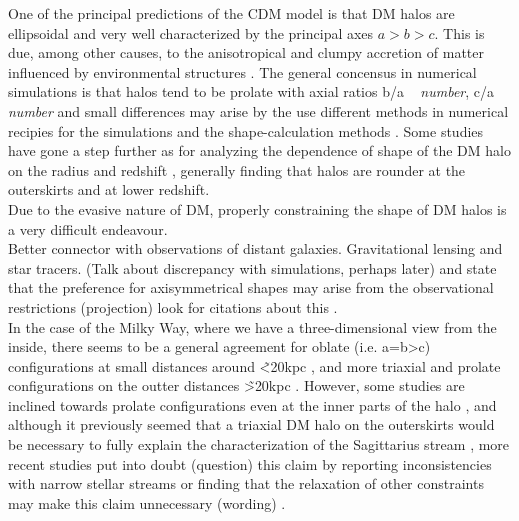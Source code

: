 \documentclass[a4paper,fleqn,usenatbib]{mnras}
\begin{document}
One of the principal predictions of the CDM model is that DM halos are ellipsoidal and very well characterized by the principal axes $a>b>c$. This is due, among other causes, to the anisotropical and clumpy accretion of matter influenced by environmental structures \citep[see?][]{environment-shape}. The general concensus in numerical simulations \citep[e.g.][]{TriaxialHalos1,TriaxialHalos2,etc} is that halos tend to be prolate with axial ratios b/a ~ \textit{number}, c/a ~ \textit{number} and small differences may arise by the use different methods in numerical recipies for the simulations and the shape-calculation methods  \citep[see][]{Allgood et al. 2006}. Some studies have gone a step further as for analyzing the dependence of shape of the DM halo on the radius and redshift \citep[e.g.][]{Shape-radius-papers, including Allgood}, generally finding that halos are rounder at the outerskirts and at lower redshift.\\

Due to the evasive nature of DM, properly constraining the shape of DM halos is a very difficult endeavour.\\

Better connector with observations of distant galaxies. Gravitational lensing and star tracers. (Talk about discrepancy with simulations, perhaps later) and state that the preference for axisymmetrical shapes may arise from the observational restrictions (projection) look for citations about this .\\

In the case of the Milky Way, where we have a three-dimensional view from the inside, there seems to be a general agreement for oblate (i.e. a=b>c) configurations at small distances around \~ <20kpc \citep[see][]{LM10,Bovy2016,Loebman,Vera-Ciro, RobOllingMerrifield,Bovy,BanerjeeChanda}, and more triaxial and prolate configurations on the outter distances \~>20kpc \citep[see][]{Vera-Ciro,LMJ09,Deg,BanerjeeChanda}. However, some studies are inclined towards prolate configurations even at the inner parts of the halo \citep[see][]{BowdenEvansWilliams,Findothers}, and although it previously seemed that a triaxial DM halo on the outerskirts would be necessary to fully explain the characterization of the Sagittarius stream \citep[see][]{LMJ09}, more recent studies put into doubt (question) this claim by reporting inconsistencies with narrow stellar streams \citet{PearsonKupperJohtnston, MoreLikeThis} or finding that the relaxation of other constraints may make this claim unnecessary (wording) \citet{IbataLewisMartin}.\\
\end{document}
